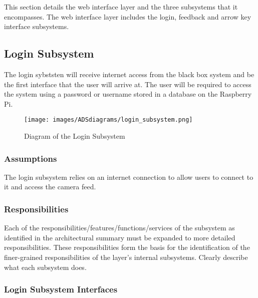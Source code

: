 This section details the web interface layer and the three subsystems that it encompasses. The web interface layer includes the login, feedback and arrow key interface subsystems.

\subsection{Login Subsystem}
The login sybststen will receive internet access from the black box system and be the first interface that the user will arrive at. The user will be required to access the system using a password or username stored in a database on the Raspberry Pi.

\begin{figure}[h!]
	\centering
 	\texttt{[image: images/ADSdiagrams/login\_subsystem.png]}
 \caption{Diagram of the Login Subsystem}
\end{figure}

\subsubsection{Assumptions}
The login subsystem relies on an internet connection to allow users to connect to it and access the camera feed.

\subsubsection{Responsibilities}
Each of the responsibilities/features/functions/services of the subsystem as identified in the architectural summary must be expanded to more detailed responsibilities. These responsibilities form the basis for the identification of the finer-grained responsibilities of the layer's internal subsystems. Clearly describe what each subsystem does.

\subsubsection{Login Subsystem  Interfaces}

